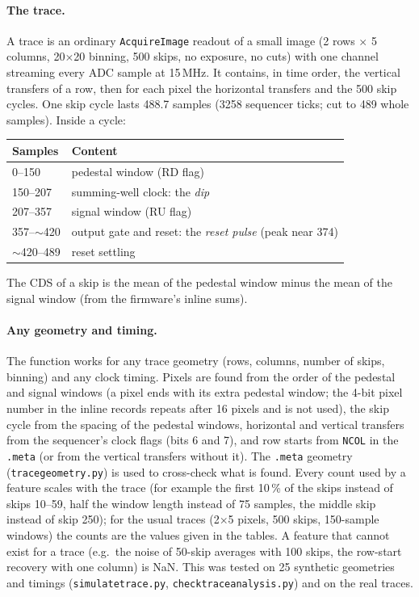 \documentclass[10pt]{article}
\newcommand{\code}[1]{\texttt{#1}}
\renewcommand{\_}{\oldunderscore\allowbreak}
\begin{document}
\paragraph{The trace.} A trace is an ordinary \code{AcquireImage} readout of a small image (2 rows $\times$ 5 columns,
20$\times$20 binning, 500 skips, no exposure, no cuts) with one channel streaming every ADC sample at 15\,MHz. It contains, in time
order, the vertical transfers of a row, then for each pixel the horizontal transfers and the 500 skip cycles. One skip cycle
lasts 488.7 samples (3258 sequencer ticks; cut to 489 whole samples). Inside a cycle:
\begin{center}
\begin{tabular}{ll}
\toprule
Samples & Content \\
\midrule
0--150 & pedestal window (RD flag) \\
150--207 & summing-well clock: the \emph{dip} \\
207--357 & signal window (RU flag) \\
357--$\sim$420 & output gate and reset: the \emph{reset pulse} (peak near 374) \\
$\sim$420--489 & reset settling \\
\bottomrule
\end{tabular}
\end{center}
The CDS of a skip is the mean of the pedestal window minus the mean of the signal window (from the firmware's inline sums).

\paragraph{Any geometry and timing.} The function works for any trace geometry (rows, columns, number of
skips, binning) and any clock timing. Pixels are found from the order of the pedestal and signal windows (a pixel ends with
its extra pedestal window; the 4-bit pixel number in the inline records repeats after 16 pixels and is not used), the skip
cycle from the spacing of the pedestal windows, horizontal and vertical transfers from the sequencer's clock flags (bits 6
and 7), and row starts from \code{NCOL} in the \code{.meta} (or from the vertical transfers without it). The \code{.meta}
geometry (\code{trace\_geometry.py}) is used to cross-check what is found. Every count used by a feature scales with the
trace (for example the first 10\,\% of the skips instead of skips 10--59, half the window length instead of 75 samples, the
middle skip instead of skip 250); for the usual traces (2$\times$5 pixels, 500 skips, 150-sample windows) the counts are
the values given in the tables. A feature that cannot exist for a trace (e.g.\ the noise of 50-skip averages with 100
skips, the row-start recovery with one column) is NaN. This was tested on 25 synthetic geometries and timings
(\code{simulate\_trace.py}, \code{check\_trace\_analysis.py}) and on the real traces.
\end{document}
